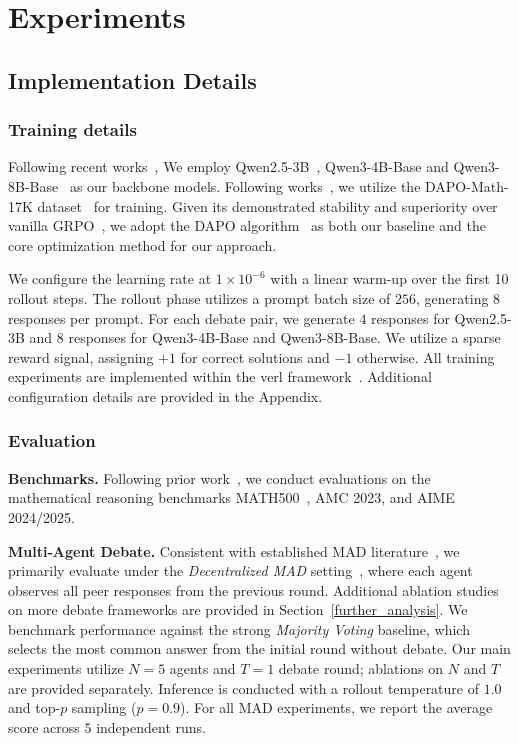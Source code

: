 \section{Experiments}
\label{experiments}

\subsection{Implementation Details}
\label{sec:implementation}

\subsubsection{Training details}
 Following recent works~\citep{zheng2025first,cheng2025reasoning,zheng2025parallelr1parallelthinkingreinforcement}, We employ Qwen2.5-3B~\cite{qwen2025qwen25technicalreport}, Qwen3-4B-Base and Qwen3-8B-Base~\cite{yang2025qwen3} as our backbone models. Following works~\citep{yu2025dapo,cheng2025reasoning,cui2025entropy}, we utilize the DAPO-Math-17K dataset~\citep{yu2025dapo} for training. Given its demonstrated stability and superiority over vanilla GRPO~\citep{yu2025dapo,cheng2025reasoning}, we adopt the DAPO algorithm~\cite{yu2025dapo} as both our baseline and the core optimization method for our \SDRL{} approach. 

We configure the learning rate at $1 \times 10^{-6}$ with a linear warm-up over the first 10 rollout steps. The rollout phase utilizes a prompt batch size of $256$, generating $8$ responses per prompt. For each debate pair, we generate $4$ responses for Qwen2.5-3B and $8$ responses for Qwen3-4B-Base and Qwen3-8B-Base. We utilize a sparse reward signal, assigning $+1$ for correct solutions and $-1$ otherwise. All training experiments are implemented within the verl framework~\citep{sheng2024hybridflow}. Additional configuration details are provided in the Appendix.

\subsubsection{Evaluation}

\textbf{Benchmarks.} Following prior work~\cite{choi2025debate,zhao2025majority,li2025off}, we conduct evaluations on the mathematical reasoning benchmarks MATH500~\citep{hendrycks2021measuring}, AMC 2023, and AIME 2024/2025.

\textbf{Multi-Agent Debate.} Consistent with established MAD literature~\citep{choi2025debate}, we primarily evaluate under the \textit{Decentralized MAD} setting~\cite{du2023improving,choi2025debate}, where each agent observes all peer responses from the previous round. Additional ablation studies on more debate frameworks are provided in Section~\ref{further_analysis}. We benchmark performance against the strong \textit{Majority Voting} baseline, which selects the most common answer from the initial round without debate. Our main experiments utilize $N=5$ agents and $T=1$ debate round; ablations on $N$ and $T$ are provided separately. Inference is conducted with a rollout temperature of $1.0$ and top-$p$ sampling ($p = 0.9$). For all MAD experiments, we report the average score across $5$ independent runs.

